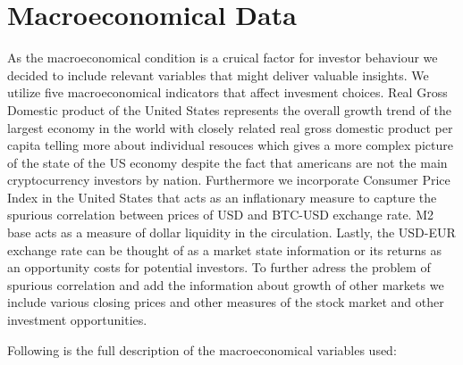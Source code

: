 \section{Macroeconomical Data}

As the macroeconomical condition is a cruical factor for investor behaviour 
we decided to include relevant variables that might deliver valuable
insights. We utilize five macroeconomical indicators that affect invesment choices.
Real Gross Domestic product of the United States represents the overall
growth trend of the largest economy in the world with closely related real
gross domestic product per capita telling more about individual resouces which
gives a more complex picture of the state of the US economy despite the 
fact that americans are not the main cryptocurrency investors by nation.
Furthermore we incorporate Consumer Price Index in the United States that
acts as an inflationary measure to capture the spurious correlation between 
prices of USD and BTC-USD exchange rate. M2 base acts as a measure
of dollar liquidity in the circulation. Lastly, the USD-EUR exchange rate
can be thought of as a market state information or its returns as an 
opportunity costs for potential investors. To further adress the problem of spurious
correlation and add the information about growth of other markets we include
various closing prices and other measures of the stock market and other 
investment opportunities. 


Following is the full description of the macroeconomical
variables used:

